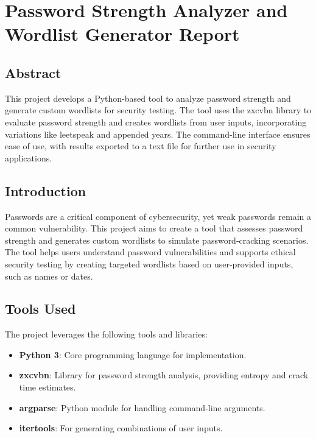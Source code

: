 \documentclass[a4paper,12pt]{article}
\begin{document}
\section*{Password Strength Analyzer and Wordlist Generator Report}

\subsection*{Abstract}
This project develops a Python-based tool to analyze password strength and generate custom wordlists for security testing. The tool uses the zxcvbn library to evaluate password strength and creates wordlists from user inputs, incorporating variations like leetspeak and appended years. The command-line interface ensures ease of use, with results exported to a text file for further use in security applications.

\subsection*{Introduction}
Passwords are a critical component of cybersecurity, yet weak passwords remain a common vulnerability. This project aims to create a tool that assesses password strength and generates custom wordlists to simulate password-cracking scenarios. The tool helps users understand password vulnerabilities and supports ethical security testing by creating targeted wordlists based on user-provided inputs, such as names or dates.

\subsection*{Tools Used}
The project leverages the following tools and libraries:
\begin{itemize}
    \item \textbf{Python 3}: Core programming language for implementation.
    \item \textbf{zxcvbn}: Library for password strength analysis, providing entropy and crack time estimates.
    \item \textbf{argparse}: Python module for handling command-line arguments.
    \item \textbf{itertools}: For generating combinations of user inputs.
\end{itemize}
\end{document}
